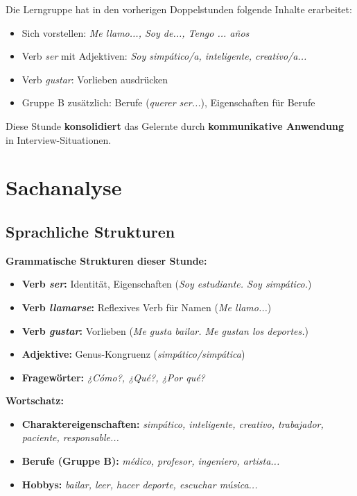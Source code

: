 \documentclass[11pt, a4paper]{article}
\newcommand{\es}[1]{\textcolor{spanisch}{\textit{#1}}}
\begin{document}
Die Lerngruppe hat in den vorherigen Doppelstunden folgende Inhalte erarbeitet:
\begin{itemize}[leftmargin=2em]
    \item Sich vorstellen: \es{Me llamo..., Soy de..., Tengo ... años}
    \item Verb \es{ser} mit Adjektiven: \es{Soy simpático/a, inteligente, creativo/a...}
    \item Verb \es{gustar}: Vorlieben ausdrücken
    \item Gruppe B zusätzlich: Berufe (\es{querer ser...}), Eigenschaften für Berufe
\end{itemize}

Diese Stunde \textbf{konsolidiert} das Gelernte durch \textbf{kommunikative Anwendung} in Interview-Situationen.


\section{Sachanalyse}

\subsection{Sprachliche Strukturen}

\textbf{Grammatische Strukturen dieser Stunde:}
\begin{itemize}[leftmargin=2em]
    \item \textbf{Verb \es{ser}:} Identität, Eigenschaften (\es{Soy estudiante. Soy simpático.})
    \item \textbf{Verb \es{llamarse}:} Reflexives Verb für Namen (\es{Me llamo...})
    \item \textbf{Verb \es{gustar}:} Vorlieben (\es{Me gusta bailar. Me gustan los deportes.})
    \item \textbf{Adjektive:} Genus-Kongruenz (\es{simpático/simpática})
    \item \textbf{Fragewörter:} \es{¿Cómo?, ¿Qué?, ¿Por qué?}
\end{itemize}

\textbf{Wortschatz:}
\begin{itemize}[leftmargin=2em]
    \item \textbf{Charaktereigenschaften:} \es{simpático, inteligente, creativo, trabajador, paciente, responsable...}
    \item \textbf{Berufe (Gruppe B):} \es{médico, profesor, ingeniero, artista...}
    \item \textbf{Hobbys:} \es{bailar, leer, hacer deporte, escuchar música...}
\end{itemize}
\end{document}
